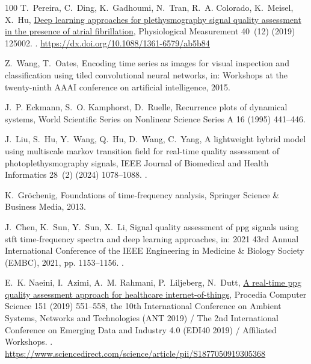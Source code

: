 \documentclass[final,3p,times,twocolumn]{elsarticle}
\begin{document}
\begin{thebibliography}{100}
T.~Pereira, C.~Ding, K.~Gadhoumi, N.~Tran, R.~A. Colorado, K.~Meisel, X.~Hu,
  \href{https://dx.doi.org/10.1088/1361-6579/ab5b84}{Deep learning approaches
  for plethysmography signal quality assessment in the presence of atrial
  fibrillation}, Physiological Measurement 40~(12) (2019) 125002.
\newblock \href {https://doi.org/10.1088/1361-6579/ab5b84}
  {}.
\newline\urlprefix\url{https://dx.doi.org/10.1088/1361-6579/ab5b84}

Z.~Wang, T.~Oates, Encoding time series as images for visual inspection and
  classification using tiled convolutional neural networks, in: Workshops at
  the twenty-ninth AAAI conference on artificial intelligence, 2015.

J.~P. Eckmann, S.~O. Kamphorst, D.~Ruelle, Recurrence plots of dynamical
  systems, World Scientific Series on Nonlinear Science Series A 16 (1995)
  441--446.

J.~Liu, S.~Hu, Y.~Wang, Q.~Hu, D.~Wang, C.~Yang, A lightweight hybrid model
  using multiscale markov transition field for real-time quality assessment of
  photoplethysmography signals, IEEE Journal of Biomedical and Health
  Informatics 28~(2) (2024) 1078--1088.
\newblock \href {https://doi.org/10.1109/JBHI.2023.3331975}
  {}.

K.~Gr{\"o}chenig, Foundations of time-frequency analysis, Springer Science \&
  Business Media, 2013.

J.~Chen, K.~Sun, Y.~Sun, X.~Li, Signal quality assessment of ppg signals using
  stft time-frequency spectra and deep learning approaches, in: 2021 43rd
  Annual International Conference of the IEEE Engineering in Medicine \&
  Biology Society (EMBC), 2021, pp. 1153--1156.
\newblock \href {https://doi.org/10.1109/EMBC46164.2021.9630758}
  {}.

E.~K. Naeini, I.~Azimi, A.~M. Rahmani, P.~Liljeberg, N.~Dutt,
  \href{https://www.sciencedirect.com/science/article/pii/S1877050919305368}{A
  real-time ppg quality assessment approach for healthcare internet-of-things},
  Procedia Computer Science 151 (2019) 551--558, the 10th International
  Conference on Ambient Systems, Networks and Technologies (ANT 2019) / The 2nd
  International Conference on Emerging Data and Industry 4.0 (EDI40 2019) /
  Affiliated Workshops.
\newblock \href {https://doi.org/https://doi.org/10.1016/j.procs.2019.04.074}
  {}.
\newline\urlprefix\url{https://www.sciencedirect.com/science/article/pii/S1877050919305368}


\end{thebibliography}
\end{document}
